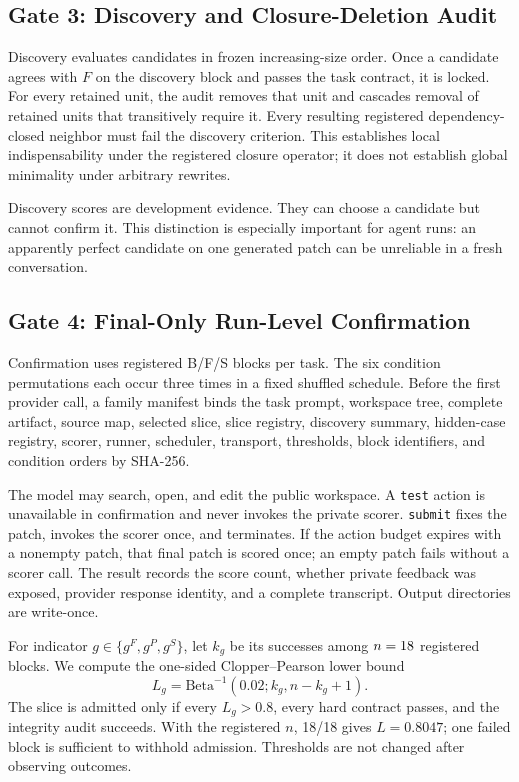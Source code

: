 \documentclass[letterpaper]{article} %
\begin{document}
\subsection{Gate 3: Discovery and Closure-Deletion Audit}

Discovery evaluates candidates in frozen increasing-size order.  Once a
candidate agrees with $F$ on the discovery block and passes the task contract,
it is locked.  For every retained unit, the audit removes that unit and
cascades removal of retained units that transitively require it.  Every
resulting registered dependency-closed neighbor must fail the discovery
criterion.  This establishes local indispensability under the registered
closure operator; it does not establish global minimality under arbitrary
rewrites.

Discovery scores are development evidence.  They can choose a candidate but
cannot confirm it.  This distinction is especially important for agent runs:
an apparently perfect candidate on one generated patch can be unreliable in a
fresh conversation.

\subsection{Gate 4: Final-Only Run-Level Confirmation}

Confirmation uses \EffectSliceReplicatesPerTask{} registered B/F/S blocks per
task.  The six condition permutations each occur three times in a fixed
shuffled schedule.  Before the first provider call, a family manifest binds the
task prompt, workspace tree, complete artifact, source map, selected slice,
slice registry, discovery summary, hidden-case registry, scorer, runner,
scheduler, transport, thresholds, block identifiers, and condition orders by
SHA-256.

The model may search, open, and edit the public workspace.  A \texttt{test}
action is unavailable in confirmation and never invokes the private scorer.
\texttt{submit} fixes the patch, invokes the scorer once, and terminates.  If
the action budget expires with a nonempty patch, that final patch is scored
once; an empty patch fails without a scorer call.  The result records the score
count, whether private feedback was exposed, provider response identity, and a
complete transcript.  Output directories are write-once.

For indicator $g\in\{g^F,g^P,g^S\}$, let $k_g$ be its successes among
$n=18{}$ registered blocks.  We compute the
one-sided Clopper--Pearson lower bound
\begin{equation}
L_g=\mathrm{Beta}^{-1}(0.02;k_g,n-k_g+1).
\end{equation}
The slice is admitted only if every $L_g>0.8$, every hard contract passes, and
the integrity audit succeeds.  With the registered $n$, 18/18 gives
$L=0.8047$; one failed block is sufficient to withhold admission.  Thresholds
are not changed after observing outcomes.
\end{document}
